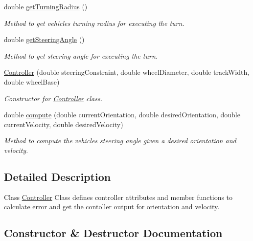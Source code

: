 \begin{DoxyCompactItemize}
double \mbox{\hyperlink{classController_a30079abc08acf260716cf663070249ac}{get\+Turning\+Radius}} ()
\begin{DoxyCompactList}\small\item\em Method to get vehicle\textquotesingle{}s turning radius for executing the turn. \end{DoxyCompactList}\item 
double \mbox{\hyperlink{classController_a63b99bb3559bd410951915a4795b154c}{get\+Steering\+Angle}} ()
\begin{DoxyCompactList}\small\item\em Method to get steering angle for executing the turn. \end{DoxyCompactList}\item 
\mbox{\hyperlink{classController_a1bd6d3476317e67b44a34e3c3f68e649}{Controller}} (double steering\+Constraint, double wheel\+Diameter, double track\+Width, double wheel\+Base)
\begin{DoxyCompactList}\small\item\em Constructor for \mbox{\hyperlink{classController}{Controller}} class. \end{DoxyCompactList}\item 
double \mbox{\hyperlink{classController_af192a4eff58739a3e7e206adfb150c2d}{compute}} (double current\+Orientation, double desired\+Orientation, double current\+Velocity, double desired\+Velocity)
\begin{DoxyCompactList}\small\item\em Method to compute the vehicle\textquotesingle{}s steering angle given a desired orientation and velocity. \end{DoxyCompactList}\end{DoxyCompactItemize}


\subsection{Detailed Description}
Class \mbox{\hyperlink{classController}{Controller}} Class defines controller attributes and member functions to calculate error and get the contoller output for orientation and velocity. 

\subsection{Constructor \& Destructor Documentation}
\mbox{\label{classController_a1bd6d3476317e67b44a34e3c3f68e649}} 
